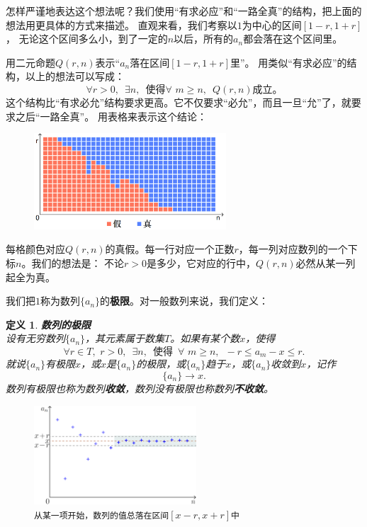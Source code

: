 \documentclass[12pt,UTF8]{ctexbook}
\newtheorem{df}{定义}[section]
\begin{document}
怎样严谨地表达这个想法呢？我们使用“有求必应”和“一路全真”的结构，把上面的想法用更具体的方式来描述。
直观来看，我们考察以$1$为中心的区间$[1-r,1+r]$，
无论这个区间多么小，到了一定的$n$以后，所有的$a_n$都会落在这个区间里。

用二元命题$Q(r, n)$表示“$a_n$落在区间$[1-r,1+r]$里”。
用类似“有求必应”的结构，以上的想法可以写成：
$$\forall r > 0, \,\,\, \exists n,  \,\,\, \mbox{使得} \forall \,\, m \geqslant n, \,\,\, Q(r, n)\mbox{成立。}$$
这个结构比“有求必允”结构要求更高。它不仅要求“必允”，而且一旦“允”了，就要求之后“一路全真”。
用表格来表示这个结论：

\begin{figure}[h] %
    \centering
    \includegraphics[width=0.64\textwidth]{数列极限2.png}
\end{figure}

每格颜色对应$Q(r, n)$的真假。每一行对应一个正数$r$，每一列对应数列的一个下标$n$。我们的想法是：
不论$r>0$是多少，它对应的行中，$Q(r, n)$必然从某一列起全为真。

我们把$1$称为数列$\{a_n\}$的\textbf{极限}。对一般数列来说，我们定义：
\begin{df}\textbf{数列的极限} \\
设有无穷数列$\{a_n\}$，其元素属于数集$T$。如果有某个数$x$，使得
$$ \forall r\in T, \,\, r > 0, \,\,\, \exists n,  \,\,\, \mbox{使得} \,\,\, \forall \,\, m \geqslant n, \,\,\, - r \leqslant a_m - x \leqslant r. $$
就说$\{a_n\}$有极限$x$，或$x$是$\{a_n\}$的极限，或$\{a_n\}$趋于$x$，或$\{a_n\}$收敛到$x$，记作
$$\{a_n\} \to x.$$
数列有极限也称为数列\textbf{收敛}，数列没有极限也称数列\textbf{不收敛}。
\end{df}

\begin{figure}[h] %
    \vspace{-14pt}
    \centering
    \includegraphics[width=0.54\textwidth]{数列极限1.png}
    \caption*{\texttt{从某一项开始，数列的值总落在区间}$[x-r,x+r]$\texttt{中}}
\end{figure}
\end{document}
